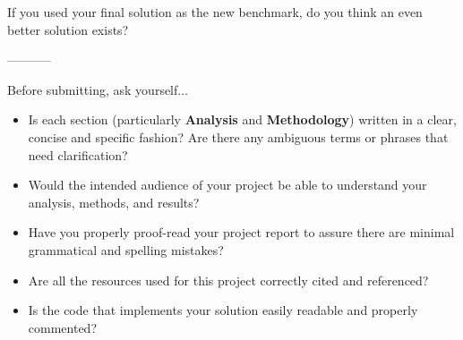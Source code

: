 \documentclass[12pt,journal,compsoc]{IEEEtran}
\begin{document}
If you used your final solution as the new benchmark, do you think an even better solution exists?

-----------

Before submitting, ask yourself...
\begin{itemize}

  \item Is each section (particularly \textbf{Analysis} and \textbf{Methodology}) written in a clear, concise and specific fashion? Are there any ambiguous terms or phrases that need clarification?
  \item Would the intended audience of your project be able to understand your analysis, methods, and results?
  \item Have you properly proof-read your project report to assure there are minimal grammatical and spelling mistakes?
  \item Are all the resources used for this project correctly cited and referenced?
  \item Is the code that implements your solution easily readable and properly commented?

\end{itemize}








%
\end{document}
